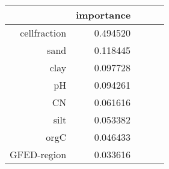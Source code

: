 \begin{tabular}{rrrrr}
\toprule
 & importance \\
\midrule
cellfraction & 0.494520 \\
sand & 0.118445 \\
clay & 0.097728 \\
pH & 0.094261 \\
CN & 0.061616 \\
silt & 0.053382 \\
orgC & 0.046433 \\
GFED-region & 0.033616 \\
\bottomrule
\end{tabular}
